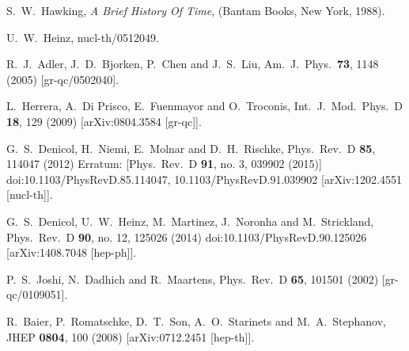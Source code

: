\documentclass[article,twocolumn]{revtex4}
\begin{document}
\begin{thebibliography}{99}
  S.~W.~Hawking,
  {\em A Brief History Of Time},
  (Bantam Books, New York, 1988).
  
  U.~W.~Heinz,
  nucl-th/0512049.
    
  R.~J.~Adler, J.~D.~Bjorken, P.~Chen and J.~S.~Liu,
  Am.\ J.\ Phys.\  {\bf 73}, 1148 (2005)
  [gr-qc/0502040].

  L.~Herrera, A.~Di Prisco, E.~Fuenmayor and O.~Troconis,
  Int.\ J.\ Mod.\ Phys.\ D {\bf 18}, 129 (2009)
  [arXiv:0804.3584 [gr-qc]].

  G.~S.~Denicol, H.~Niemi, E.~Molnar and D.~H.~Rischke,
  Phys.\ Rev.\ D {\bf 85}, 114047 (2012)
  Erratum: [Phys.\ Rev.\ D {\bf 91}, no. 3, 039902 (2015)]
  doi:10.1103/PhysRevD.85.114047, 10.1103/PhysRevD.91.039902
  [arXiv:1202.4551 [nucl-th]].
  
  G.~S.~Denicol, U.~W.~Heinz, M.~Martinez, J.~Noronha and M.~Strickland,
  Phys.\ Rev.\ D {\bf 90}, no. 12, 125026 (2014)
  doi:10.1103/PhysRevD.90.125026
  [arXiv:1408.7048 [hep-ph]].
  
  P.~S.~Joshi, N.~Dadhich and R.~Maartens,
  Phys.\ Rev.\ D {\bf 65}, 101501 (2002)
  [gr-qc/0109051].

  R.~Baier, P.~Romatschke, D.~T.~Son, A.~O.~Starinets and M.~A.~Stephanov,
  JHEP {\bf 0804}, 100 (2008)
  [arXiv:0712.2451 [hep-th]].


\end{thebibliography}
\end{document}
